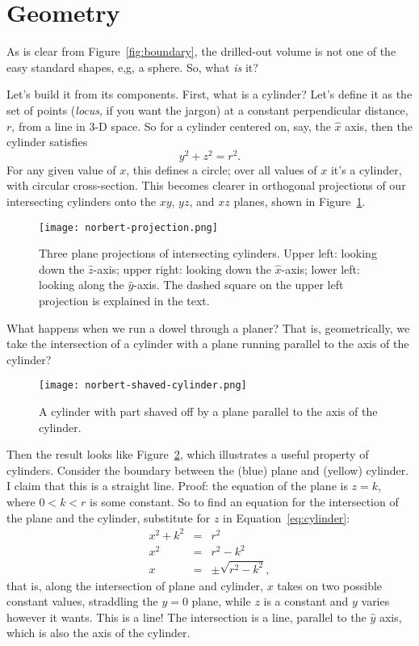 \documentclass[twocolumn]{article}
\theoremstyle{definition}
\theoremstyle{plain}
\begin{document}
\section{Geometry}

As is clear from Figure~\ref{fig:boundary}, the drilled-out volume is
not one of the easy standard shapes, e,g, a sphere.  So, what
\emph{is} it?

Let's build it from its components.  First, what is a cylinder?  Let's
define it as the set of points (\emph{locus}, if you want the jargon)
at a constant perpendicular distance, $r$, from a line in 3-D space.
So for a cylinder centered on, say, the $\hat{x}$ axis, then the
cylinder satisfies
\begin{equation}
  y^2 + z^2 = r^2.
\end{equation}
\label{eq:cylinder}
For any given value of $x$, this defines a circle; over all values of
$x$ it's a cylinder, with circular cross-section.
This becomes clearer in orthogonal projections of our intersecting
cylinders onto the $xy$, $yz$, and $xz$ planes, shown in
Figure~\ref{fig:projections}.
\begin{figure}
  \texttt{[image: norbert-projection.png]}
  \caption{Three plane projections of intersecting cylinders.  Upper
    left:  looking down the $\hat{z}$-axis; upper right:  looking down
    the $\hat{x}$-axis; lower left:  looking along the
    $\hat{y}$-axis.  The dashed square on the upper left projection is
    explained in the text.}
  \label{fig:projections}
\end{figure}

What happens when we run a dowel through a planer?  That is,
geometrically, we take the intersection of a cylinder with a plane
running parallel to the axis of the cylinder?
\begin{figure}
  \texttt{[image: norbert-shaved-cylinder.png]}
  \caption{A cylinder with part shaved off by a plane parallel to the
    axis of the cylinder.}
  \label{fig:shaved-cylinder}
\end{figure}
Then the result looks like Figure~\ref{fig:shaved-cylinder}, which
illustrates a useful property of cylinders.  Consider the boundary
between the (blue) plane and (yellow) cylinder.  I claim that this is
a straight line.  Proof:  the equation of the plane is $z = k$, where
$0 < k < r$ is some constant.  So to find an equation for the
intersection of the plane and the cylinder, substitute for $z$ in
Equation~\ref{eq:cylinder}:
\begin{eqnarray*}
  x^2 + k^2 & = & r^2 \\
  x^2 & = & r^2 - k^2 \\
  x & = & \pm \sqrt{r^2 - k^2},
\end{eqnarray*}
that is, along the intersection of plane and cylinder, $x$ takes on
two possible constant values, straddling the $y=0$ plane, while $z$ is
a constant and $y$ varies however it wants.  This is a line!  The
intersection is a line, parallel to the $\hat{y}$ axis, which is also
the axis of the cylinder.
\end{document}
